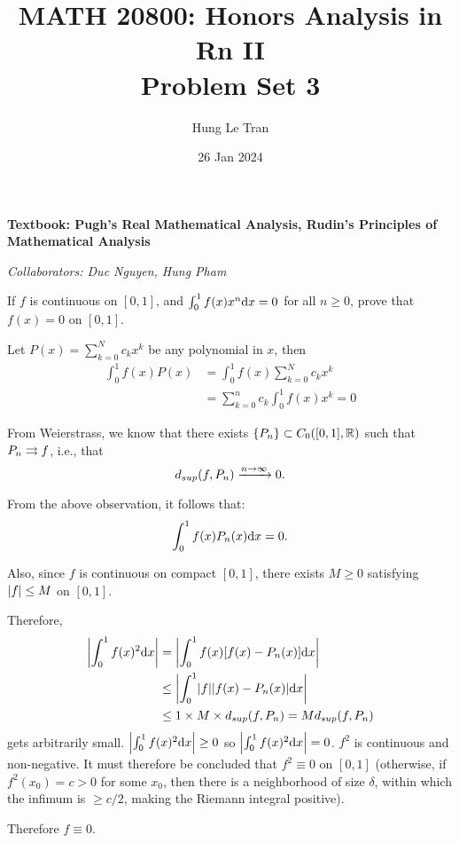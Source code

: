 \documentclass[a4paper, 12pt]{article}
\title{MATH 20800: Honors Analysis in Rn II \\ \large Problem Set 3}
\date{26 Jan 2024}
\author{Hung Le Tran}
\begin{document}
\maketitle
\setcounter{section}{3}
\textbf{Textbook: Pugh's Real Mathematical Analysis, Rudin's Principles of Mathematical Analysis}

\textit{Collaborators: Duc Nguyen, Hung Pham}
\begin{problem} 
    If $f$ is continuous on $[0, 1]$, and $\int_{0}^{1} f(x) x^n \dx = 0$ for all $n \geq 0$, prove that $f(x) = 0$ on $[0, 1]$.
\end{problem}
\begin{solution}
    Let $P(x) = \sum_{k=0}^{N} c_kx^k$ be any polynomial in $x$, then
    \begin{align*}
        \int_{0}^{1} f(x) P(x) &= \int_{0}^{1} f(x) \sum_{k=0}^{N} c_k x^k\\
        &= \sum_{k=0}^{n} c_k \int_{0}^1 f(x) x^k = 0
    \end{align*}

    From Weierstrass, we know that there exists $\{P_n\} \subset C_0([0, 1], \bbr)$ such that $P_n \unicvg f$, i.e., that \begin{equation*}
    d_{sup}(f, P_n) \cvgn 0.
    \end{equation*}
    
    From the above observation, it follows that: \begin{equation*}
    \int_{0}^{1} f(x) P_n(x) \dx = 0.
    \end{equation*}

    Also, since $f$ is continuous on compact $[0, 1]$, there exists $M \geq 0$ satisfying $\abs{f} \leq M$ on $[0, 1]$.
    
    Therefore, \begin{align*}
        \abs*{\int_{0}^{1} f(x)^2 \dx} &= \abs*{\int_{0}^{1} f(x)[f(x) - P_n(x)] \dx} \\
        &\leq \abs*{\int_{0}^{1} \abs{f} \abs{f(x) - P_n(x)} \dx} \\
        &\leq 1 \times M \times d_{sup}(f, P_n) = M d_{sup}(f, P_n)
    \end{align*}
    gets arbitrarily small. $\abs*{\int_{0}^{1} f(x)^2 \dx}  \geq 0$ so $\abs*{\int_{0}^{1} f(x)^2 \dx}  = 0$. $f^2$ is continuous and non-negative. It must therefore be concluded that $f^2 \equiv 0$ on $[0, 1]$ (otherwise, if $f^2(x_0) = c > 0$ for some $x_0$, then there is a neighborhood of size $\delta$, within which the infimum is $\geq c/2$, making the Riemann integral positive).

    Therefore $f \equiv 0$.
\end{solution}
\end{document}

